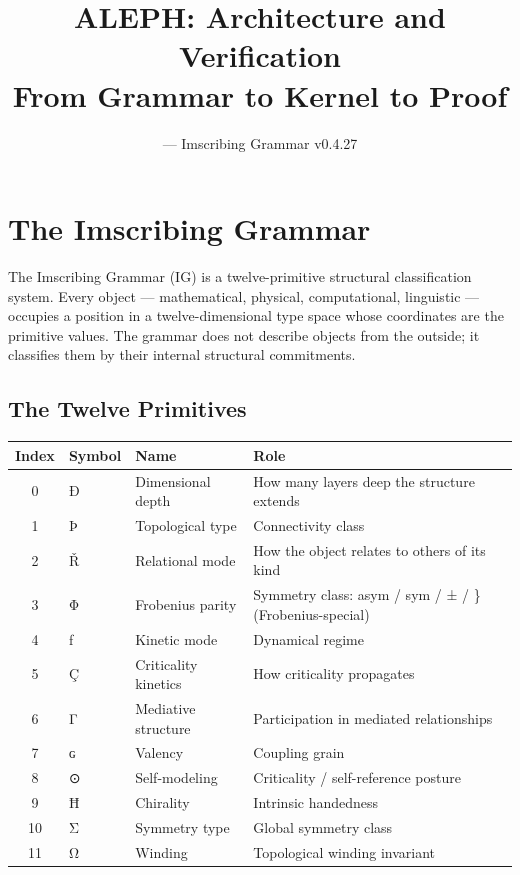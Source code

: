 \documentclass[12pt,a4paper]{article}
\title{\textbf{ALEPH: Architecture and Verification}\\[0.5em]
\large From Grammar to Kernel to Proof}
\author{\exos{} — Imscribing Grammar v0.4.27}
\date{}
\begin{document}
\maketitle
\thispagestyle{empty}
\tableofcontents
\newpage

\section{The Imscribing Grammar}

The Imscribing Grammar (IG) is a twelve-primitive structural classification system. Every object — mathematical, physical, computational, linguistic — occupies a position in a twelve-dimensional type space whose coordinates are the primitive values. The grammar does not describe objects from the outside; it classifies them by their internal structural commitments.

\subsection{The Twelve Primitives}

\begin{tabularx}{\linewidth}{c l l X}
\toprule
\textbf{Index} & \textbf{Symbol} & \textbf{Name} & \textbf{Role} \\
\midrule
0  & Ð & Dimensional depth     & How many layers deep the structure extends \\
1  & Þ & Topological type      & Connectivity class \\
2  & Ř & Relational mode       & How the object relates to others of its kind \\
3  & Φ & Frobenius parity      & Symmetry class: asym / sym / ± / \} (Frobenius-special) \\
4  & ƒ & Kinetic mode          & Dynamical regime \\
5  & Ç & Criticality kinetics  & How criticality propagates \\
6  & Γ & Mediative structure   & Participation in mediated relationships \\
7  & ɢ & Valency               & Coupling grain \\
8  & ⊙ & Self-modeling         & Criticality / self-reference posture \\
9  & Ħ & Chirality             & Intrinsic handedness \\
10 & Σ & Symmetry type         & Global symmetry class \\
11 & Ω & Winding               & Topological winding invariant \\
\bottomrule
\end{tabularx}
\end{document}
